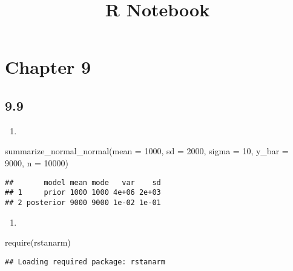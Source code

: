 \documentclass[
]{article}
\title{R Notebook}
\author{}
\date{\vspace{-2.5em}}
\newenvironment{Shaded}{\begin{snugshade}}{\end{snugshade}}
\newcommand{\AttributeTok}[1]{\textcolor[rgb]{0.77,0.63,0.00}{#1}}
\newcommand{\DecValTok}[1]{\textcolor[rgb]{0.00,0.00,0.81}{#1}}
\newcommand{\FunctionTok}[1]{\textcolor[rgb]{0.00,0.00,0.00}{#1}}
\newcommand{\NormalTok}[1]{#1}
\providecommand{\tightlist}{%
  \setlength{\itemsep}{0pt}\setlength{\parskip}{0pt}}
\begin{document}
\maketitle

\hypertarget{chapter-9}{%
\section{Chapter 9}\label{chapter-9}}

\hypertarget{section}{%
\subsection{9.9}\label{section}}

\begin{enumerate}
\def\labelenumi{\alph{enumi}.}
\tightlist
\item
\end{enumerate}

\begin{Shaded}
\begin{Highlighting}[]
\FunctionTok{summarize\_normal\_normal}\NormalTok{(}\AttributeTok{mean =} \DecValTok{1000}\NormalTok{, }\AttributeTok{sd =} \DecValTok{2000}\NormalTok{, }\AttributeTok{sigma =} \DecValTok{10}\NormalTok{,}
                        \AttributeTok{y\_bar =} \DecValTok{9000}\NormalTok{, }\AttributeTok{n =} \DecValTok{10000}\NormalTok{)}
\end{Highlighting}
\end{Shaded}

\begin{verbatim}
##       model mean mode   var    sd
## 1     prior 1000 1000 4e+06 2e+03
## 2 posterior 9000 9000 1e-02 1e-01
\end{verbatim}

\begin{enumerate}
\def\labelenumi{\alph{enumi}.}
\setcounter{enumi}{1}
\tightlist
\item
\end{enumerate}

\begin{Shaded}
\begin{Highlighting}[]
\FunctionTok{require}\NormalTok{(rstanarm)}
\end{Highlighting}
\end{Shaded}

\begin{verbatim}
## Loading required package: rstanarm
\end{verbatim}
\end{document}
